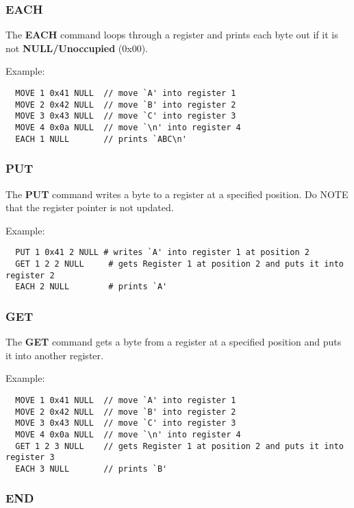 \documentclass{article}
\begin{document}
\subsubsection{\textbf{EACH}}

The \textbf{EACH} command loops through a register and prints each byte out if it is
not \textbf{NULL/Unoccupied} (0x00).

Example:
\begin{verbatim}
  MOVE 1 0x41 NULL  // move `A' into register 1
  MOVE 2 0x42 NULL  // move `B' into register 2
  MOVE 3 0x43 NULL  // move `C' into register 3
  MOVE 4 0x0a NULL  // move `\n' into register 4
  EACH 1 NULL       // prints `ABC\n'
\end{verbatim}

\pagebreak
\subsubsection{\textbf{PUT}}

The \textbf{PUT} command writes a byte to a register at a specified position. Do
NOTE that the register pointer is not updated.

Example:
\begin{verbatim}
  PUT 1 0x41 2 NULL # writes `A' into register 1 at position 2
  GET 1 2 2 NULL     # gets Register 1 at position 2 and puts it into register 2
  EACH 2 NULL        # prints `A'
\end{verbatim}

\subsubsection{\textbf{GET}}

The \textbf{GET} command gets a byte from a register at a specified position and
puts it into another register.

Example:
\begin{verbatim}
  MOVE 1 0x41 NULL  // move `A' into register 1
  MOVE 2 0x42 NULL  // move `B' into register 2
  MOVE 3 0x43 NULL  // move `C' into register 3
  MOVE 4 0x0a NULL  // move `\n' into register 4
  GET 1 2 3 NULL    // gets Register 1 at position 2 and puts it into register 3
  EACH 3 NULL       // prints `B'
\end{verbatim}

\subsubsection{\textbf{END}}
\end{document}
